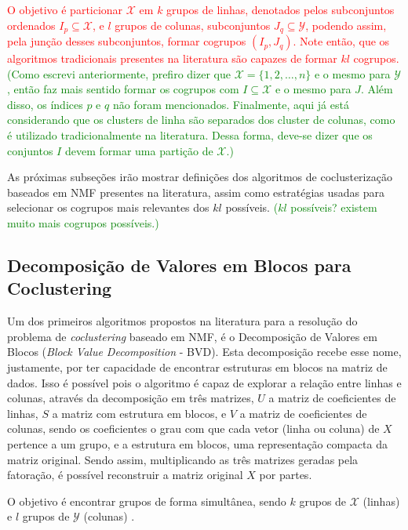 \documentclass[
    12pt,                %
    oneside,            %
    a4paper,            %
    english,            %
    brazil                %
    ]{abntex2ppgsi}
\begin{document}
\textcolor{red}{O objetivo é particionar $\mathcal{X}$ em $k$ grupos de linhas, denotados pelos subconjuntos ordenados $I_p \subseteq \mathcal{X}$, e $l$ grupos de colunas, subconjuntos $J_q \subseteq \mathcal{Y}$, podendo assim, pela junção desses subconjuntos, formar cogrupos $(I_p, J_q)$.
Note então, que os algoritmos tradicionais presentes na literatura são capazes de formar $k l$ cogrupos.}
\textcolor{green}{(Como escrevi anteriormente, prefiro dizer que $\mathcal{X}=\{1,2,\ldots,n\}$ e o mesmo para $\mathcal{Y}$, então faz mais sentido formar os cogrupos com $I\subseteq\mathcal{X}$ e o mesmo para $J$. Além disso, os índices $p$ e $q$ não foram mencionados. Finalmente, aqui já está considerando que os clusters de linha são separados dos cluster de colunas, como é utilizado tradicionalmente na literatura. Dessa forma, deve-se dizer que os conjuntos $I$ devem formar uma partição de $\mathcal{X}$.)}

As próximas subseções irão mostrar definições dos algoritmos de coclusterização baseados em NMF presentes na literatura, assim como estratégias usadas para selecionar os cogrupos mais relevantes dos $k l$ possíveis. \textcolor{green}{($kl$ possíveis? existem muito mais cogrupos possíveis.)}

\subsection{Decomposição de Valores em Blocos para Coclustering}
\label{subsec:bvd}

Um dos primeiros algoritmos propostos na literatura para a resolução do problema de \textit{coclustering} baseado em NMF, é o Decomposição de Valores em Blocos (\textit{Block Value Decomposition} - BVD).
Esta decomposição recebe esse nome, justamente, por ter capacidade de encontrar estruturas em blocos na matriz de dados.
Isso é possível pois o algoritmo é capaz de explorar a relação entre linhas e colunas, através da decomposição em três matrizes, $U$ a matriz de coeficientes de linhas, $S$ a matriz com estrutura em blocos, e $V$ a matriz de coeficientes de colunas, sendo os coeficientes o grau com que cada vetor (linha ou coluna) de $X$ pertence a um grupo, e a estrutura em blocos, uma representação compacta da matriz original.
Sendo assim, multiplicando as três matrizes geradas pela fatoração, é possível reconstruir a matriz original $X$ por partes.

O objetivo é encontrar grupos de forma simultânea, sendo $k$ grupos de $\mathcal{X}$ (linhas) e $l$ grupos de $\mathcal{Y}$ (colunas) \cite{Long2005}.
\end{document}
